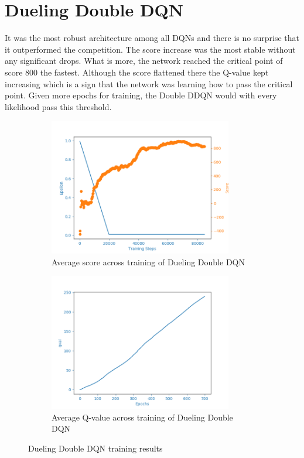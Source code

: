 \section{Dueling Double DQN}
\label{sec:results-dueling-double-dqn}

It was the most robust architecture among all DQNs and there is no surprise that it outperformed the competition. The score increase
was the most stable without any significant drops. What is more, the network reached the critical point of score 800 the fastest. Although
the score flattened there the Q-value kept increasing which is a sign that the network was learning how to pass the critical point. Given more epochs for training, the Double DDQN would with every likelihood pass this threshold.

\begin{figure}[htb]
\begin{subfigure}{.48\textwidth}
    \centering
    \includegraphics[width=8cm]{img/DuelingDDQNAgent_WamvNavTwoSetsBuoys-v0_normal_1125_0937.png}
    \caption{Average score across training of Dueling Double DQN}
    \label{fig:avg-score-dddqn}
\end{subfigure}
\begin{subfigure}{.48\textwidth}
    \centering
    \includegraphics[width=8cm]{img/DuelingDDQNAgent_WamvNavTwoSetsBuoys-v0_normal_1125_0937_qval.png}
    \caption{Average Q-value across training of Dueling Double DQN}
\end{subfigure}
\caption{Dueling Double DQN training results}
\end{figure}

